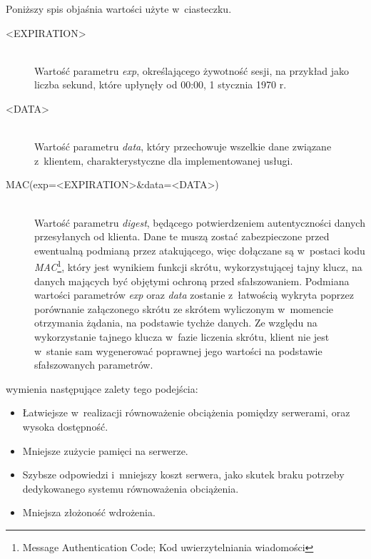 \documentclass[11pt]{aghdpl}
\begin{document}
Poniższy spis objaśnia wartości użyte w~ciasteczku.
\begin{description}
\item[<EXPIRATION>] \hfill \\
Wartość parametru \emph{exp}, określającego żywotność sesji, na przykład jako liczba sekund, które upłynęły od 00:00, 1 stycznia 1970 r.
\item[<DATA>] \hfill \\
Wartość parametru \emph{data}, który przechowuje wszelkie dane związane z~klientem, charakterystyczne dla implementowanej usługi.
\item[MAC(exp=<EXPIRATION>\&data=<DATA>)] \hfill \\
Wartość parametru \emph{digest}, będącego potwierdzeniem autentyczności danych przesyłanych od klienta. Dane te muszą zostać zabezpieczone przed ewentualną podmianą przez atakującego, więc dołączane są w~postaci kodu \emph{MAC}\footnote{Message Authentication Code; Kod uwierzytelniania wiadomości}, który jest wynikiem funkcji skrótu, wykorzystującej tajny klucz, na danych mających być objętymi ochroną przed sfałszowaniem. Podmiana wartości parametrów \emph{exp} oraz \emph{data} zostanie z~łatwością wykryta poprzez porównanie załączonego skrótu ze skrótem wyliczonym w~momencie otrzymania żądania, na podstawie tychże danych. Ze względu na wykorzystanie tajnego klucza w~fazie liczenia skrótu, klient nie jest w~stanie sam wygenerować poprawnej jego wartości na podstawie sfałszowanych parametrów.
\end{description}

\cite{SeMa08} wymienia następujące zalety tego podejścia:
\begin{itemize}
\item Łatwiejsze w~realizacji równoważenie obciążenia pomiędzy serwerami, oraz wysoka dostępność.
\item Mniejsze zużycie pamięci na serwerze.
\item Szybsze odpowiedzi i~mniejszy koszt serwera, jako skutek braku potrzeby dedykowanego systemu równoważenia obciążenia.
\item Mniejsza złożoność wdrożenia.
\end{itemize}
\end{document}
